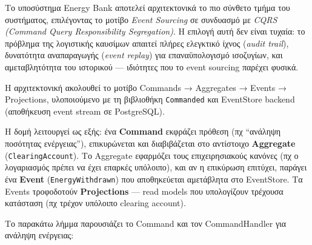 Το υποσύστημα Energy Bank αποτελεί αρχιτεκτονικά το πιο σύνθετο τμήμα
του συστήματος, επιλέγοντας το μοτίβο \emph{Event Sourcing} σε συνδυασμό
με \emph{CQRS (Command Query Responsibility Segregation)}. Η επιλογή
αυτή δεν είναι τυχαία: το πρόβλημα της λογιστικής καυσίμων απαιτεί
πλήρες ελεγκτικό ίχνος (\emph{audit trail}), δυνατότητα αναπαραγωγής
(\emph{event replay}) για επαναϋπολογισμό ισοζυγίων, και αμεταβλητότητα
του ιστορικού --- ιδιότητες που το event sourcing παρέχει φυσικά.

Η αρχιτεκτονική ακολουθεί το μοτίβο Commands → Aggregates → Events →
Projections, υλοποιούμενο με τη βιβλιοθήκη \texttt{Commanded} και
EventStore backend (αποθήκευση event stream σε PostgreSQL).

Η δομή λειτουργεί ως εξής: ένα \textbf{Command} εκφράζει πρόθεση (πχ
``ανάληψη ποσότητας ενέργειας''), επικυρώνεται και διαβιβάζεται στο
αντίστοιχο \textbf{Aggregate} (\texttt{ClearingAccount}). Το Aggregate
εφαρμόζει τους επιχειρησιακούς κανόνες (πχ ο λογαριασμός πρέπει να έχει
επαρκές υπόλοιπο), και αν η επικύρωση επιτύχει, παράγει ένα
\textbf{Event} (\texttt{EnergyWithdrawn}) που αποθηκεύεται αμετάβλητα
στο EventStore. Τα Events τροφοδοτούν \textbf{Projections} --- read
models που υπολογίζουν τρέχουσα κατάσταση (πχ τρέχον υπόλοιπο clearing
account).

Το παρακάτω λήμμα παρουσιάζει το Command και τον CommandHandler για
ανάληψη ενέργειας:

